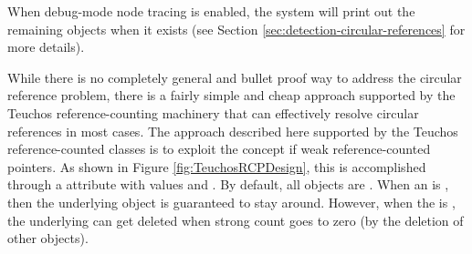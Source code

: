 \documentclass[pdf,ps2pdf,11pt]{SANDreport}
\begin{document}
When debug-mode node tracing is enabled, the system will print out the
remaining {} objects when it exists (see Section
{}\ref{sec:detection-circular-references} for more details).

While there is no completely general and bullet proof way to address
the circular reference problem, there is a fairly simple and cheap
approach supported by the Teuchos reference-counting machinery that
can effectively resolve circular references in most cases.  The
approach described here supported by the Teuchos reference-counted
classes is to exploit the concept if weak reference-counted pointers.
As shown in Figure {}\ref{fig:TeuchosRCPDesign}, this is accomplished
through a {} attribute with values {}
and {}.  By default, all {} objects are
{}.  When an {} is {}, then
the underlying {} object is guaranteed to stay
around.  However, when the {} is {}, the
underlying {} can get deleted when strong count goes
to zero (by the deletion of other {} {}
objects).
\end{document}
